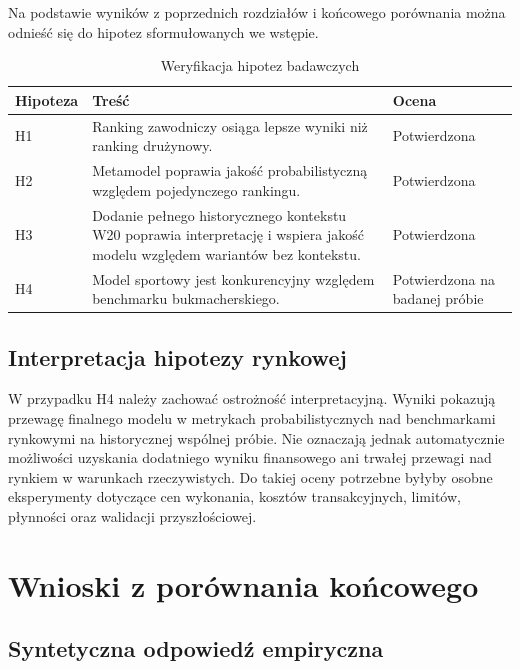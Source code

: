 Na podstawie wyników z poprzednich rozdziałów i końcowego porównania można odnieść się do hipotez sformułowanych we wstępie.

\begin{table}[H]
    \centering
    \caption{Weryfikacja hipotez badawczych}
    \label{tab:hypotheses_verification}
    \begin{tabular}{p{}p{}p{}}
        \toprule
        Hipoteza & Treść & Ocena \\
        \midrule
        H1 & Ranking zawodniczy osiąga lepsze wyniki niż ranking drużynowy. & Potwierdzona \\
        H2 & Metamodel poprawia jakość probabilistyczną względem pojedynczego rankingu. & Potwierdzona \\
        H3 & Dodanie pełnego historycznego kontekstu W20 poprawia interpretację i wspiera jakość modelu względem wariantów bez kontekstu. & Potwierdzona \\
        H4 & Model sportowy jest konkurencyjny względem benchmarku bukmacherskiego. & Potwierdzona na badanej próbie \\
        \bottomrule
    \end{tabular}
\end{table}

\subsection{Interpretacja hipotezy rynkowej}

W przypadku H4 należy zachować ostrożność interpretacyjną. Wyniki pokazują przewagę finalnego modelu w metrykach probabilistycznych nad benchmarkami rynkowymi na historycznej wspólnej próbie. Nie oznaczają jednak automatycznie możliwości uzyskania dodatniego wyniku finansowego ani trwałej przewagi nad rynkiem w warunkach rzeczywistych. Do takiej oceny potrzebne byłyby osobne eksperymenty dotyczące cen wykonania, kosztów transakcyjnych, limitów, płynności oraz walidacji przyszłościowej.

\section{Wnioski z porównania końcowego}

\subsection{Syntetyczna odpowiedź empiryczna}

